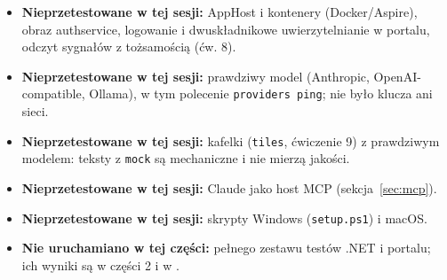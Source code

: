 {\begin{itemize}[leftmargin=*,itemsep=1pt]
  \item \textbf{Nieprzetestowane w tej sesji:} AppHost i kontenery (Docker/Aspire),
        obraz authservice, logowanie i dwuskładnikowe uwierzytelnianie w portalu,
        odczyt sygnałów z tożsamością (ćw. 8).
  \item \textbf{Nieprzetestowane w tej sesji:} prawdziwy model (Anthropic, OpenAI-compatible,
        Ollama), w tym polecenie \texttt{providers ping}; nie było klucza ani sieci.
  \item \textbf{Nieprzetestowane w tej sesji:} kafelki (\texttt{tiles}, ćwiczenie 9) z
        prawdziwym modelem: teksty z \texttt{mock} są mechaniczne i nie mierzą jakości.
  \item \textbf{Nieprzetestowane w tej sesji:} Claude jako host MCP (sekcja~\ref{sec:mcp}).
  \item \textbf{Nieprzetestowane w tej sesji:} skrypty Windows (\texttt{setup.ps1}) i
        macOS.
  \item \textbf{Nie uruchamiano w tej części:} pełnego zestawu testów .NET i portalu;
        ich wyniki są w części 2 i w .
\end{itemize}
}
